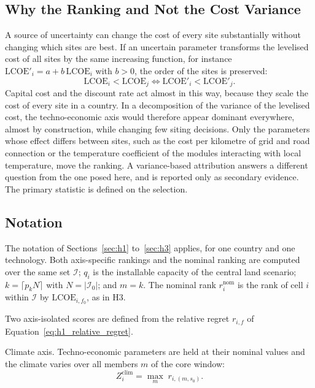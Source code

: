 \subsection{Why the Ranking and Not the Cost Variance}
\label{subsec:h4_ranking}

A source of uncertainty can change the cost of every site substantially without
changing which sites are best. If an uncertain parameter transforms the
levelised cost of all sites by the same increasing function, for instance
$\mathrm{LCOE}'_i=a+b\,\mathrm{LCOE}_i$ with $b>0$, the order of the sites is
preserved:
\begin{equation}
    \mathrm{LCOE}_i<\mathrm{LCOE}_j\iff\mathrm{LCOE}'_i<\mathrm{LCOE}'_j .
    \label{eq:h4_rank_invariance}
\end{equation}
Capital cost and the discount rate act almost in this way, because they scale the
cost of every site in a country. In a decomposition of the variance of the
levelised cost, the techno-economic axis would therefore appear dominant
everywhere, almost by construction, while changing few siting decisions. Only
the parameters whose effect differs between sites, such as the cost per
kilometre of grid and road connection or the temperature coefficient of the
modules interacting with local temperature, move the ranking. A variance-based
attribution answers a different question from the one posed here, and is
reported only as secondary evidence. The primary statistic is defined on the
selection.

\subsection{Notation}
\label{subsec:h4_notation}

The notation of Sections~\ref{sec:h1} to~\ref{sec:h3} applies, for one country
and one technology. Both axis-specific rankings and the nominal ranking are
computed over the same set $\mathcal{I}$; $q_i$ is the installable capacity of
the central land scenario; $k=\lceil p_k N\rceil$ with $N=|\mathcal{I}_0|$; and
$m=k$. The nominal rank $r^{\mathrm{nom}}_i$ is the rank of cell $i$ within
$\mathcal{I}$ by $\mathrm{LCOE}_{i,f_0}$, as in H3.

Two axis-isolated scores are defined from the relative regret $r_{i,f}$ of
Equation~\ref{eq:h1_relative_regret}.

Climate axis. Techno-economic parameters are held at their nominal values and
the climate varies over all members $m$ of the core window:
\begin{equation}
    Z^{\mathrm{clim}}_i=\max_{m}\; r_{i,(m,s_0)} .
    \label{eq:h4_clim_score}
\end{equation}

